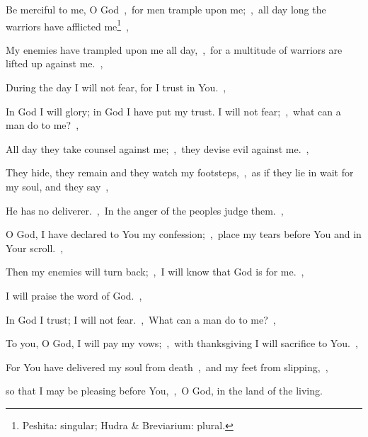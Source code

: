 \documentclass[12pt,twoside,a5paper]{article}
\begin{document}
\begin{normalparskip}
  Be merciful to me, O God~\sep\ for men trample upon me;~\sep\ all day long the warriors have afflicted me\footnote{Peshita: singular; Hudra \& Breviarium: plural.}~\sep


  My enemies have trampled upon me all day,~\sep\ for a multitude of warriors are lifted up against me.~\sep

  During the day I will not fear, for I trust in You.~\sep

  In God I will glory; in God I have put my trust. I will not fear;~\sep\ what can a man do to me?~\sep

  All day they take counsel against me;~\sep\ they devise evil against me.~\sep

  They hide, they remain and they watch my footsteps,~\sep\ as if they lie in wait for my soul, and they say~\sep

  He has no deliverer.~\sep\ In the anger of the peoples judge them.~\sep

  O God, I have declared to You my confession;~\sep\ place my tears before You and in Your scroll.~\sep

  Then my enemies will turn back;~\sep\ I will know that God is for me.~\sep

  I will praise the word of God.~\sep

  In God I trust; I will not fear.~\sep\ What can a man do to me?~\sep

  To you, O God, I will pay my vows;~\sep\ with thanksgiving I will sacrifice to You.~\sep

  For You have delivered my soul from death~\sep\ and my feet from slipping,~\sep

  so that I may be pleasing before You,~\sep\ O God, in the land of the living.
\end{normalparskip}

\end{document}
